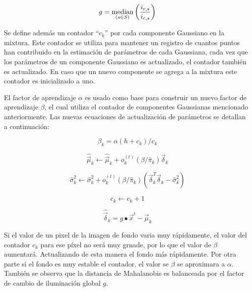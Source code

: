 \begin{equation} \label{eq:mofq}
g = \operatorname*{median}_{(s \in S)}  \left(\frac{i_{r,s}}{i_{c,s}}\right)
\end{equation}

Se define además un contador ``$c_k$'' por cada componente Gaussiano en la mixtura. Este contador se utiliza para mantener un registro de cuantos puntos han contribuido en la estimación de parámetros de cada Gaussiana, cada vez que los parámetros de un componente Gaussiano es actualizado, el contador también es actualizado. En caso que un nuevo componente se agrega a la mixtura este contador es inicializado a uno. 

El factor de aprendizaje $\alpha$ es usado como base para construir un nuevo factor de aprendizaje $\beta$, el cual utiliza el contador de componentes Gaussianas mencionado anteriormente. Las nuevas ecuaciones de actualización de parámetros se detallan a continuación:


\begin{equation} \label{eq:sagmm_betha}
\beta_k = \alpha(h + c_k)/c_k
\end{equation}

\begin{equation} \label{eq:sagmm_mu}
\hat{\vec{\mu}}_k \leftarrow \hat{\vec{\mu}}_k + o^{(t)}_k (\beta/\hat{\pi}_k) \vec{\delta}_k
\end{equation}

\begin{equation} \label{eq:sagmm_sigma}
\hat{\sigma}^2_k \leftarrow \hat{\sigma}^2_k + o^{(t)}_k (\beta/\hat{\pi}_k) (\vec{\delta}^T_k \vec{\delta}_k - \hat{\sigma}^2_k)
\end{equation}

\begin{equation} \label{eq:sagmm_ck}
c_k \leftarrow c_k + 1
\end{equation}

\begin{equation} \label{eq:sagmm_delta}
\hat{\vec{\delta}}_k = g \bullet \vec{x}^{t} - \hat{\vec{\mu}}_k
\end{equation}

Si el valor de un pixel de la imagen de fondo varia muy rápidamente, el valor del contador $c_k$ para ese píxel no será muy grnade, por lo que el valor de $\beta$ aumentará. Actualizando de esta manera el fondo más rápidamente. Por otra parte si el fondo  es muy estable el contador, el valor se $\beta$ se aproximara a $\alpha$. También se observa que la distancia de Mahalanobis es balanceada por el factor de cambio de iluminación global $g$.


